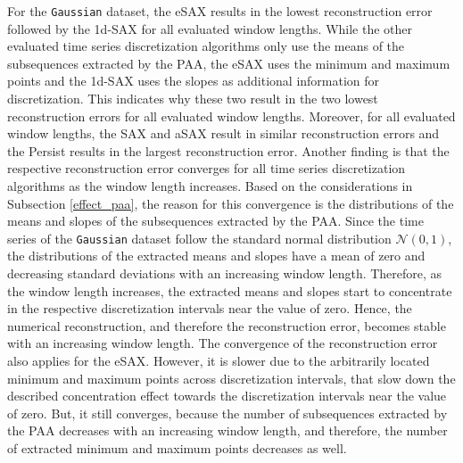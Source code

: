 For the \texttt{Gaussian} dataset, the \ac{eSAX} results in the lowest reconstruction error followed by the \ac{1d-SAX} for all evaluated window lengths. While the other evaluated time series discretization algorithms only use the means of the subsequences extracted by the \ac{PAA}, the \ac{eSAX} uses the minimum and maximum points and the \ac{1d-SAX} uses the slopes as additional information for discretization. This indicates why these two result in the two lowest reconstruction errors for all evaluated window lengths. Moreover, for all evaluated window lengths, the \ac{SAX} and \ac{aSAX} result in similar reconstruction errors and the Persist results in the largest reconstruction error. Another finding is that the respective reconstruction error converges for all time series discretization algorithms as the window length increases. Based on the considerations in Subsection \ref{effect_paa}, the reason for this convergence is the distributions of the means and slopes of the subsequences extracted by the \ac{PAA}. Since the time series of the \texttt{Gaussian} dataset follow the standard normal distribution $\mathcal{N}(0,1)$, the distributions of the extracted means and slopes have a mean of zero and decreasing standard deviations with an increasing window length. Therefore, as the window length increases, the extracted means and slopes start to concentrate in the respective discretization intervals near the value of zero. Hence, the numerical reconstruction, and therefore the reconstruction error, becomes stable with an increasing window length. The convergence of the reconstruction error also applies for the \ac{eSAX}. However, it is slower due to the arbitrarily located minimum and maximum points across discretization intervals, that slow down the described concentration effect towards the discretization intervals near the value of zero. But, it still converges, because the number of subsequences extracted by the \ac{PAA} decreases with an increasing window length, and therefore, the number of extracted minimum and maximum points decreases as well. \newline
